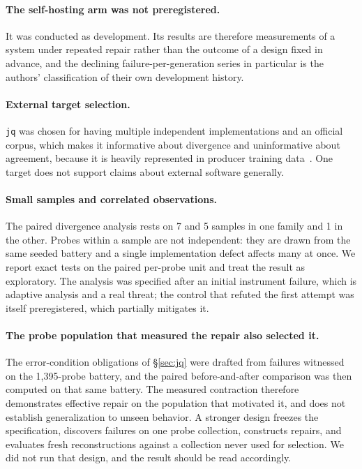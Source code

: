 \documentclass[10pt,twocolumn]{article}
\begin{document}
\paragraph{The self-hosting arm was not preregistered.} It was conducted
as development. Its results are therefore measurements of a system under
repeated repair rather than the outcome of a design fixed in advance, and
the declining failure-per-generation series in particular is the authors'
classification of their own development history.

\paragraph{External target selection.} \texttt{jq} was chosen for having
multiple independent implementations and an official corpus, which makes
it informative about divergence and uninformative about agreement,
because it is heavily represented in producer training
data~\cite{sainz2023,carlini2023}. One target does not support claims
about external software generally.

\paragraph{Small samples and correlated observations.} The paired
divergence analysis rests on 7 and 5 samples in one family and 1 in the
other. Probes within a sample are not independent: they are drawn from
the same seeded battery and a single implementation defect affects many
at once. We report exact tests on the paired per-probe unit and treat the
result as exploratory. The analysis was specified after an initial
instrument failure, which is adaptive analysis and a real threat; the
control that refuted the first attempt was itself preregistered, which
partially mitigates it.

\paragraph{The probe population that measured the repair also selected
it.} The error-condition obligations of \S\ref{sec:jq} were drafted from
failures witnessed on the 1{,}395-probe battery, and the paired
before-and-after comparison was then computed on that same battery. The
measured contraction therefore demonstrates effective repair on the
population that motivated it, and does not establish generalization to
unseen behavior. A stronger design freezes the specification, discovers
failures on one probe collection, constructs repairs, and evaluates
fresh reconstructions against a collection never used for selection. We
did not run that design, and the result should be read accordingly.
\end{document}
